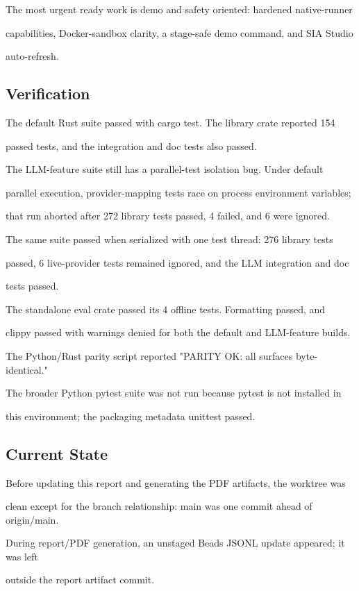 \documentclass[twocolumn,10pt,letterpaper]{article}
\begin{document}
The most urgent ready work is demo and safety oriented: hardened native-runner

capabilities, Docker-sandbox clarity, a stage-safe demo command, and SIA Studio

auto-refresh.


\subsection{Verification}

The default Rust suite passed with cargo test. The library crate reported 154

passed tests, and the integration and doc tests also passed.


The LLM-feature suite still has a parallel-test isolation bug. Under default

parallel execution, provider-mapping tests race on process environment variables;

that run aborted after 272 library tests passed, 4 failed, and 6 were ignored.

The same suite passed when serialized with one test thread: 276 library tests

passed, 6 live-provider tests remained ignored, and the LLM integration and doc

tests passed.


The standalone eval crate passed its 4 offline tests. Formatting passed, and

clippy passed with warnings denied for both the default and LLM-feature builds.

The Python/Rust parity script reported "PARITY OK: all surfaces byte-identical."

The broader Python pytest suite was not run because pytest is not installed in

this environment; the packaging metadata unittest passed.


\subsection{Current State}

Before updating this report and generating the PDF artifacts, the worktree was

clean except for the branch relationship: main was one commit ahead of origin/main.

During report/PDF generation, an unstaged Beads JSONL update appeared; it was left

outside the report artifact commit.
\end{document}
